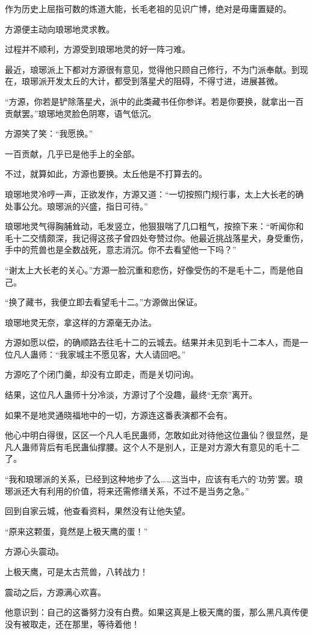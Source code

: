 \begin{this_body}
作为历史上屈指可数的炼道大能，长毛老祖的见识广博，绝对是毋庸置疑的。

方源便主动向琅琊地灵求教。

过程并不顺利，方源受到琅琊地灵的好一阵刁难。

最近，琅琊派上下都对方源很有意见，觉得他只顾自己修行，不为门派奉献。到现在，琅琊派开发太丘的大计，都受到落星犬的阻碍，不得寸进，进展甚微。

“方源，你若是铲除落星犬，派中的此类藏书任你参详。若是你要换，就拿出一百贡献罢。”琅琊地灵脸色阴寒，语气低沉。

方源笑了笑：“我愿换。”

一百贡献，几乎已是他手上的全部。

不过，就算如此，方源也要换。太丘他是不打算去的。

琅琊地灵冷哼一声，正欲发作，方源又道：“一切按照门规行事，太上大长老的确处事公允。琅琊派的兴盛，指日可待。”

琅琊地灵气得胸脯耸动，毛发竖立，他狠狠喘了几口粗气，按捺下来：“听闻你和毛十二交情颇深，我记得这孩子曾四处夸赞过你。他最近挑战落星犬，身受重伤，手中的荒兽也是全数战死，意志消沉。你不去看望他一下吗？”

“谢太上大长老的关心。”方源一脸沉重和悲伤，好像受伤的不是毛十二，而是他自己。

“换了藏书，我便立即去看望毛十二。”方源做出保证。

琅琊地灵无奈，拿这样的方源毫无办法。

方源如愿以偿，的确顺路去往毛十二的云城去。结果并未见到毛十二本人，而是一位凡人蛊师：“我家城主不愿见客，大人请回吧。”

方源吃了个闭门羹，却没有立即走，而是关切问询。

结果，这位凡人蛊师十分冷淡，方源讨了个没趣，最终“无奈”离开。

如果不是地灵通晓福地中的一切，方源连这番表演都不会有。

他心中明白得很，区区一个凡人毛民蛊师，怎敢如此对待他这位蛊仙？很显然，是凡人蛊师背后有毛民蛊仙撑腰。这个人不是别人，正是对方源大有意见的毛十二了。

“我和琅琊派的关系，已经到这种地步了么……这当中，应该有毛六的‘功劳’罢。琅琊派还大有利用的价值，将来还需修缮关系，不过不是当务之急。”

回到自家云城，他查看资料，果然没有让他失望。

“原来这颗蛋，竟然是上极天鹰的蛋！”

方源心头震动。

上极天鹰，可是太古荒兽，八转战力！

震动之后，方源满心欢喜。

他意识到：自己的这番努力没有白费。如果这真是上极天鹰的蛋，那么黑凡真传便没有被取走，还在那里，等待着他！

\end{this_body}

